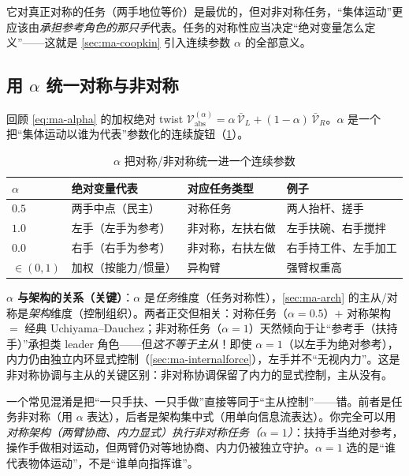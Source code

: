 \begin{insight}[对称表述的“绝对 $=$ 中点”是关于谁代表集体运动的民主假设]
它对真正对称的任务（两手地位等价）是最优的，但对非对称任务，“集体运动”更应该由\emph{承担参考角色的那只手}代表。任务的对称性应当决定“绝对变量怎么定义”——这就是 \cref{sec:ma-coopkin} 引入连续参数 $\alpha$ 的全部意义。
\end{insight}

\subsection{用 $\alpha$ 统一对称与非对称}
\label{sec:ma-alpha-unify}

回顾 \cref{eq:ma-alpha} 的加权绝对 twist $\boldsymbol{\mathcal{V}}_{\text{abs}}^{(\alpha)}=\alpha\,\bar{\boldsymbol{\mathcal{V}}}_L+(1-\alpha)\,\bar{\boldsymbol{\mathcal{V}}}_R$。$\alpha$ 是一个把“集体运动以谁为代表”参数化的连续旋钮（\cref{tab:ma-alpha-table}）。

\begin{table}[H]\centering\small
\caption{$\alpha$ 把对称/非对称统一进一个连续参数}
\label{tab:ma-alpha-table}
\begin{tabular}{llll}
\toprule
$\alpha$ & 绝对变量代表 & 对应任务类型 & 例子 \\
\midrule
$0.5$ & 两手中点（民主） & 对称任务 & 两人抬杆、搓手 \\
$1.0$ & 左手（左手为参考） & 非对称，左扶右做 & 左手扶碗、右手搅拌 \\
$0.0$ & 右手（右手为参考） & 非对称，右扶左做 & 右手持工件、左手加工 \\
$\in(0,1)$ & 加权（按能力/惯量） & 异构臂 & 强臂权重高 \\
\bottomrule
\end{tabular}
\end{table}

\noindent\textbf{$\alpha$ 与架构的关系（关键）}：$\alpha$ 是\emph{任务}维度（任务对称性），\cref{sec:ma-arch} 的主从/对称是\emph{架构}维度（控制组织）。两者正交但相关：对称任务（$\alpha=0.5$）$+$ 对称架构 $=$ 经典 Uchiyama--Dauchez；非对称任务（$\alpha=1$）天然倾向于让“参考手（扶持手）”承担类 leader 角色——但\emph{这不等于主从}！即使 $\alpha=1$（以左手为绝对参考），内力仍由独立内环显式控制（\cref{sec:ma-internalforce}），左手并不“无视内力”。这是非对称协调与主从的关键区别：非对称协调保留了内力的显式控制，主从没有。

\begin{insight}
一个常见混淆是把“一只手扶、一只手做”直接等同于“主从控制”——错。前者是任务非对称（用 $\alpha$ 表达），后者是架构集中式（用单向信息流表达）。你完全可以用\emph{对称架构（两臂协商、内力显式）执行非对称任务（$\alpha=1$）}：扶持手当绝对参考，操作手做相对运动，但两臂仍对等地协商、内力仍被独立守护。$\alpha=1$ 选的是“谁代表物体运动”，不是“谁单向指挥谁”。
\end{insight}

